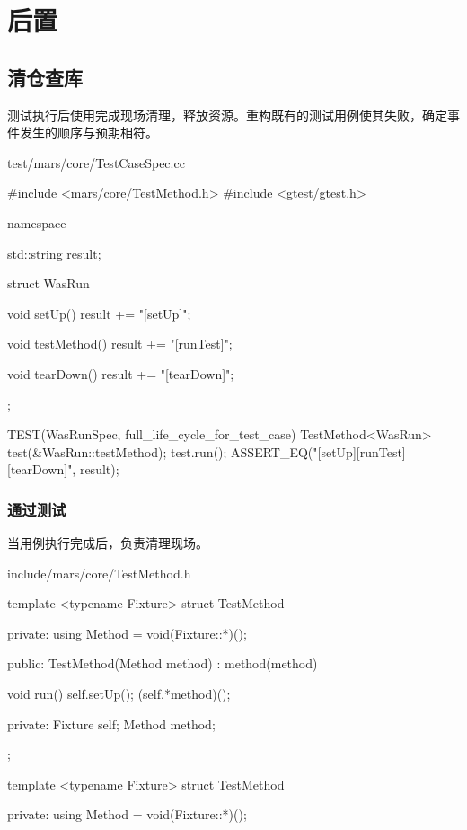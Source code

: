 \section{后置}

\begin{content}

\subsection{清仓查库}

测试执行后使用完成现场清理，释放资源。重构既有的测试用例使其失败，确定事件发生的顺序与预期相符。

\begin{nodiff}{test/mars/core/TestCaseSpec.cc}
 \begin{c++}
#include <mars/core/TestMethod.h>
#include <gtest/gtest.h>

namespace {
  std::string result;

  struct WasRun {
    void setUp() {
      result += "[setUp]";
    }

    void testMethod() {
      result += "[runTest]";
    }

    void tearDown() {
      result += "[tearDown]";
    }
  };
}

TEST(WasRunSpec, full_life_cycle_for_test_case) {
  TestMethod<WasRun> test(&WasRun::testMethod);
  test.run();
  ASSERT_EQ("[setUp][runTest][tearDown]", result);
}
\end{c++}
\end{nodiff}

\subsubsection{通过测试}

当用例执行完成后，负责清理现场。

\begin{diff}{include/mars/core/TestMethod.h}
 \begin{minicpp}
template <typename Fixture>
struct TestMethod {
private:
  using Method = void(Fixture::*)();

public:
  TestMethod(Method method)
    : method(method) {}

  void run() {
    self.setUp();
    (self.*method)();
  }

private:
  Fixture self;
  Method method;
};
  \end{minicpp}
\tcblower
 \begin{minicpp}
template <typename Fixture>
struct TestMethod {
private:
  using Method = void(Fixture::*)();

}
\end{minicpp}
\end{diff}
\end{content}
